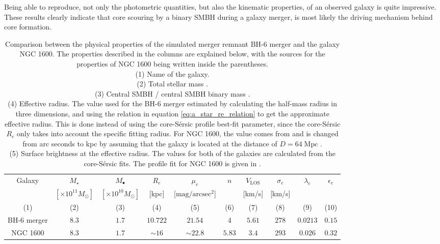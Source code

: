 \documentclass[english, oneside]{HYgradu}
\begin{document}
Being able to reproduce, not only the photometric quantities, but also the kinematic properties, of an observed galaxy is quite impressive. These results clearly indicate that core scouring by a binary SMBH during a galaxy merger, is most likely the driving mechanism behind core formation.

\begin{table}
	\begin{center}
		\scriptsize
		\begin{tabular}{c c c c c c c c c c}
		\hline
		\hline
		Galaxy & $M_\star$ & $M_\bullet$ & $R_e$ & $\mu_e$ & $n$ & 
		$V_\mathrm{LOS}$ & $\sigma_e$ & $\lambda_e$ &
		$\epsilon_e$ \\
		& $[\times 10^{11} M_\odot]$ & $[\times 10^{10} M_\odot]$ &
		[kpc] & [$\mathrm{mag/arcsec^2}$] & & [km/s] & [km/s] & & \\
		(1) & (2) & (3) & (4) & (5) & (6) & (7) & (8) & (9) & (10) \\
		\hline
		BH-6 merger & $8.3$ & $1.7$ & $10.722$ & $21.54$ & $4$ & $5.61$ & $278$ & $0.0213$ & $0.15$ \\
		NGC 1600 & $8.3$ & $1.7$ & $\sim 16$ & $\sim 22.8$ & $5.83$ & $3.4$ & 
		$293$ & $0.026$ & $0.32$ \\
		\hline
		\end{tabular}
	\end{center}
	\caption{Comparison between the physical properties of the simulated merger remnant BH-6 merger and the galaxy NGC 1600. The properties described in the columns are explained below, with the sources for the properties of NGC 1600 being written inside the parentheses. \\
	(1) Name of the galaxy. \\
	(2) Total stellar mass \citep{Thomas2016}. \\
	(3) Central SMBH / central SMBH binary mass \citep{Thomas2016}. \\
	(4) Effective radius. The value used for the BH-6 merger estimated by calculating the half-mass radius in three dimensions, and using the relation in equation \ref{eq:a_star_re_relation} to get the approximate effective radius. This is done instead of using the core-Sérsic profile best-fit parameter, since the core-Sérsic $R_e$ only takes into account the specific fitting radius. For NGC 1600, the value comes from \cite{Thomas2016} and is changed from arc seconds to kpc by assuming that the galaxy is located at the distance of $D = 64 \; \mathrm{Mpc}$ \citep{Thomas2016}. \\
	(5) Surface brightness at the effective radius. The values for both of the galaxies are calculated from the core-Sérsic fits. The profile fit for NGC 1600 is given in \citep{Thomas2016}. \\
}
\end{table}
\end{document}
